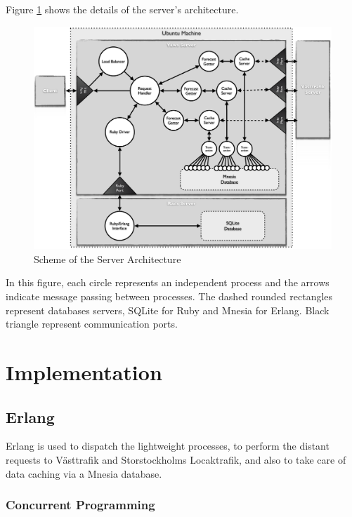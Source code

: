 Figure \ref{fig:server_architecture} shows the details of the server's architecture.\\

\begin{figure}[ht]
\center
\includegraphics[scale=0.4]{pics/server_side}
\caption{Scheme of the Server Architecture}
\label{fig:server_architecture}
\end{figure}

In this figure, each circle represents an independent process and the arrows indicate message passing between processes. The dashed rounded rectangles represent databases servers, SQLite for Ruby and Mnesia for Erlang. Black triangle represent communication ports.

\section{Implementation}


\subsection{Erlang}

Erlang is used to dispatch the lightweight processes, to perform the distant requests to Västtrafik and Storstockholms Locaktrafik, and also to take care of data caching via a Mnesia database.

\subsubsection{Concurrent Programming}

